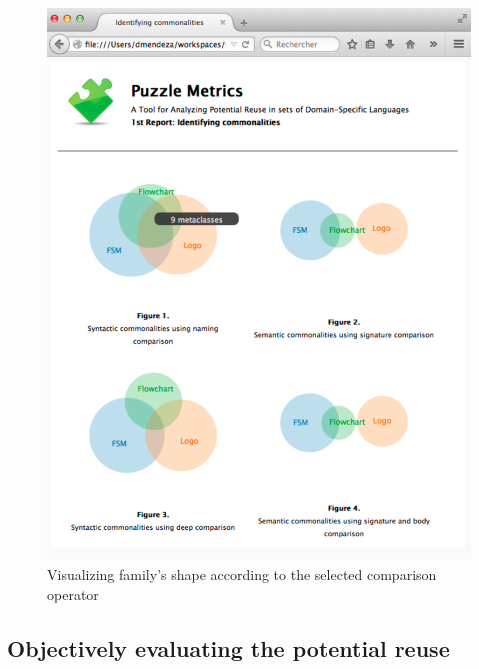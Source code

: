 \begin{figure}
\centering
\includegraphics[width=1\linewidth]{images/domains-inaction.pdf}
\caption{Visualizing family's shape according to the selected comparison operator}
\label{fig:shape}
\end{figure}


\subsection{Objectively evaluating the potential reuse}

